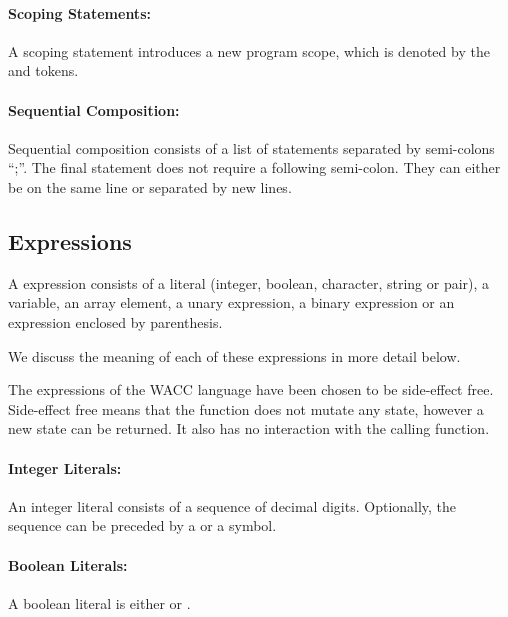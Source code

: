 \documentclass[a4paper]{article}
\theoremstyle{definition}
\begin{document}
\paragraph{Scoping Statements:}
A scoping statement introduces a new program scope, which is denoted by the  and  tokens.

\paragraph{Sequential Composition:}
Sequential composition consists of a list of statements  separated by semi-colons ``;''. The final statement does not require a following semi-colon. They can either be on the same line or separated by new lines.

\subsection{Expressions}
A expression  consists of
a literal (integer, boolean, character, string or pair),
a variable,
an array element,
a unary expression,
a binary expression
or an expression enclosed by parenthesis.

We discuss the meaning of each of these expressions in more detail below.

The expressions of the WACC language have been chosen to be side-effect free. Side-effect free means that the function does not mutate any state, however a new state can be returned. It also has no interaction with the calling function.

\paragraph{Integer Literals:}
An integer literal  consists of a sequence of decimal digits.
Optionally, the sequence can be preceded by a \lit{+} or a \lit{-} symbol.

\paragraph{Boolean Literals:}
A boolean literal  is either  or .
\end{document}
